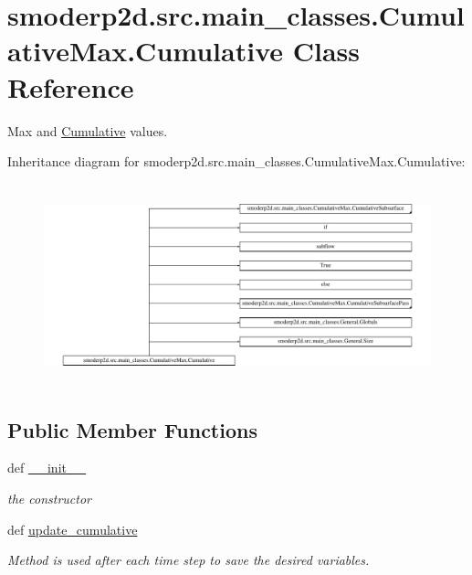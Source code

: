 \hypertarget{classsmoderp2d_1_1src_1_1main__classes_1_1CumulativeMax_1_1Cumulative}{\section{smoderp2d.\-src.\-main\-\_\-classes.\-Cumulative\-Max.\-Cumulative Class Reference}
\label{classsmoderp2d_1_1src_1_1main__classes_1_1CumulativeMax_1_1Cumulative}
}


Max and \hyperlink{classsmoderp2d_1_1src_1_1main__classes_1_1CumulativeMax_1_1Cumulative}{Cumulative} values.  


Inheritance diagram for smoderp2d.\-src.\-main\-\_\-classes.\-Cumulative\-Max.\-Cumulative\-:\begin{figure}[H]
\begin{center}
\leavevmode
\includegraphics[height=5.846868cm]{d2/d0a/classsmoderp2d_1_1src_1_1main__classes_1_1CumulativeMax_1_1Cumulative}
\end{center}
\end{figure}
\subsection*{Public Member Functions}
\begin{DoxyCompactItemize}
\item 
def \hyperlink{classsmoderp2d_1_1src_1_1main__classes_1_1CumulativeMax_1_1Cumulative_aa0e7706be42a1c06b1861c1e8c100c4c}{\-\_\-\-\_\-init\-\_\-\-\_\-}
\begin{DoxyCompactList}\small\item\em the constructor \end{DoxyCompactList}\item 
def \hyperlink{classsmoderp2d_1_1src_1_1main__classes_1_1CumulativeMax_1_1Cumulative_a8ff1f325481804578ec1cdc47616a808}{update\-\_\-cumulative}
\begin{DoxyCompactList}\small\item\em Method is used after each time step to save the desired variables. \end{DoxyCompactList}\end{DoxyCompactItemize}
